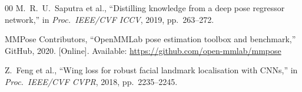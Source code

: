 \documentclass[11pt,conference,a4paper]{APSIPA2026}
\begin{document}
\begin{thebibliography}{00}
M.~R.~U.~Saputra et al.,
``Distilling knowledge from a deep pose regressor network,''
in \textit{Proc.\ IEEE/CVF ICCV}, 2019, pp.~263--272.

MMPose Contributors,
``OpenMMLab pose estimation toolbox and benchmark,''
GitHub, 2020. [Online].
Available: \url{https://github.com/open-mmlab/mmpose}

Z.~Feng et al.,
``Wing loss for robust facial landmark localisation with CNNs,''
in \textit{Proc.\ IEEE/CVF CVPR}, 2018, pp.~2235--2245.

\end{thebibliography}
\end{document}
